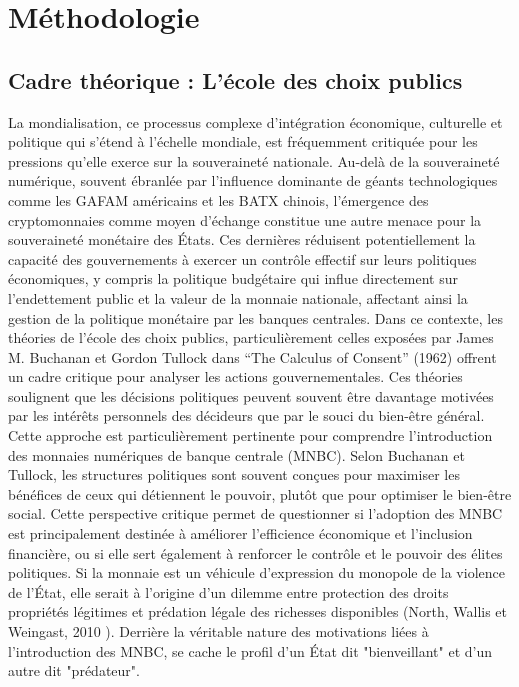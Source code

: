 \documentclass[12pt]{article}
\begin{document}
\section{Méthodologie}

\subsection{Cadre théorique : L'école des choix publics}

La mondialisation, ce processus complexe d'intégration économique, culturelle et politique qui s'étend à l'échelle mondiale, est fréquemment critiquée pour les pressions qu'elle exerce sur la souveraineté nationale. Au-delà de la souveraineté numérique, souvent ébranlée par l'influence dominante de géants technologiques comme les GAFAM américains et les BATX chinois, l'émergence des cryptomonnaies comme moyen d'échange constitue une autre menace pour la souveraineté monétaire des États. Ces dernières réduisent potentiellement la capacité des gouvernements à exercer un contrôle effectif sur leurs politiques économiques, y compris la politique budgétaire qui influe directement sur l'endettement public et la valeur de la monnaie nationale, affectant ainsi la gestion de la politique monétaire par les banques centrales. Dans ce contexte, les théories de l'école des choix publics, particulièrement celles exposées par James M. Buchanan et Gordon Tullock dans “The Calculus of Consent” (1962) offrent un cadre critique pour analyser les actions gouvernementales. Ces théories soulignent que les décisions politiques peuvent souvent être davantage motivées par les intérêts personnels des décideurs que par le souci du bien-être général. Cette approche est particulièrement pertinente pour comprendre l'introduction des monnaies numériques de banque centrale (MNBC). Selon Buchanan et Tullock, les structures politiques sont souvent conçues pour maximiser les bénéfices de ceux qui détiennent le pouvoir, plutôt que pour optimiser le bien-être social. Cette perspective critique permet de questionner si l'adoption des MNBC est principalement destinée à améliorer l'efficience économique et l'inclusion financière, ou si elle sert également à renforcer le contrôle et le pouvoir des élites politiques. Si la monnaie est un véhicule d'expression du monopole de la violence de l’État, elle serait à l’origine d’un dilemme entre protection des droits propriétés légitimes et prédation légale des richesses disponibles (North, Wallis et Weingast, 2010 \cite{RePEc:eee:soceco:v:39:y:2010:i:1:p:110-111}). Derrière la véritable nature des motivations liées à l'introduction des MNBC, se cache le profil d'un État dit "bienveillant" et d'un autre dit "prédateur". 
\end{document}
